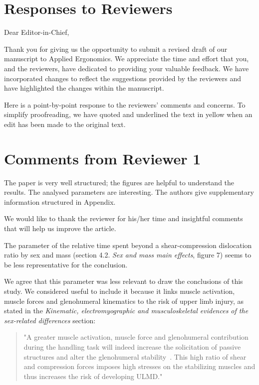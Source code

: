 \documentclass[preprint,review,12pt]{elsarticle}
\begin{document}
    \section*{Responses to Reviewers}
    \setcounter{section}{0}
    Dear Editor-in-Chief,

    Thank you for giving us the opportunity to submit a revised draft of our manuscript to Applied Ergonomics.
    We appreciate the time and effort that you, and the reviewers, have dedicated to providing your valuable feedback.
    We have incorporated changes to reflect the suggestions provided by the reviewers and have highlighted the changes within the manuscript.

    Here is a point-by-point response to the reviewers' comments and concerns.
    To simplify proofreading, we have quoted and underlined the text in yellow when an edit has been made to the original text.


    \section{Comments from Reviewer 1}\label{sec:reviewer-1}
    \begin{formal}
        The paper is very well structured;
        the figures are helpful to understand the results.
        The analysed parameters are interesting.
        The authors give supplementary information structured in Appendix.
    \end{formal}

    We would like to thank the reviewer for his/her time and insightful comments that will help us improve the article.

    \begin{formal}
        The parameter of the relative time spent beyond a shear-compression dislocation ratio by sex and mass (section 4.2. \textit{Sex and mass main effects}, figure 7) seems to be less representative for the conclusion.
    \end{formal}
    We agree that this parameter was less relevant to draw the conclusions of this study.
    We considered useful to include it because it links muscle activation, muscle forces and glenohumeral kinematics to the risk of upper limb injury, as stated in the \textit{Kinematic, electromyographic and musculoskeletal evidences of the sex-related differences} section:

    \begin{quote}
        "A greater muscle activation, muscle force and glenohumeral contribution during the handling task will indeed increase the solicitation of passive structures and alter the glenohumeral stability~\citep{Bergmann2007-zj}.
        This high ratio of shear and compression forces imposes high stresses on the stabilizing muscles and thus increases the risk of developing ULMD."
    \end{quote}
\end{document}
